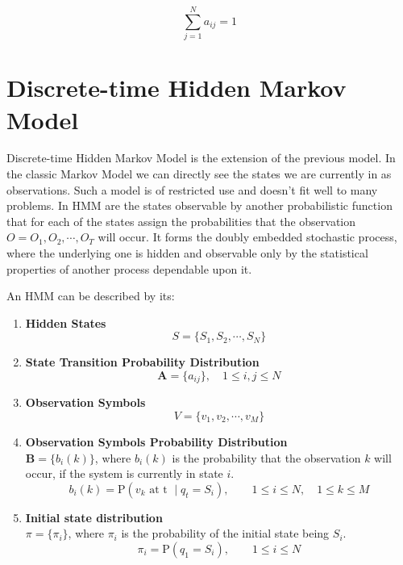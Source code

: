 \documentclass[thesis=M,english]{FITthesis}[2012/10/20]
\newcommand{\matr}[1]{\mathbf{#1}}
\begin{document}
\begin{equation}
   \sum_{j=1}^N a_{ij} = 1
\end{equation}

\section{Discrete-time Hidden Markov Model}

Discrete-time Hidden Markov Model is the extension of the previous model. In the classic Markov Model we can directly see the states we are currently in as observations. Such a model is of restricted use and doesn't fit well to many problems. In HMM are the states observable by another probabilistic function that for each of the states assign the probabilities that the observation $O = O_1,O_2,\cdots,O_T$ will occur. It forms the doubly embedded stochastic process, where the underlying one is hidden and observable only by the statistical properties of another process dependable upon it.

An HMM can be described by its:

\begin{enumerate}[resume]
\setcounter{enumi}{0}
\item \textbf{Hidden States}
\begin{equation}
S = \{ S_1,S_2, \cdots, S_N \}
\end{equation} 
\item \textbf{State Transition Probability Distribution}
\begin{equation}\label{eq:tp}
\matr{A} = \{ a_{ij} \}, \quad 1 \leq i,j \leq N
\end{equation} 
\item \textbf{Observation Symbols}
\begin{equation}
V = \{ v_1,v_2, \cdots, v_M \} 
\end{equation}
\item \textbf{Observation Symbols Probability Distribution} \\
$\matr{B} = \{ b_{i}(k) \}$, where $b_{i}(k)$ is the probability that the observation $k$ will occur, if the system is currently in state $i$. 
\begin{equation}
b_i(k) = \mathrm{P}(v_k \text{ at t } \mid q_t = S_i), \qquad 1 \leq i \leq N, \quad 1 \leq k \leq M
\end{equation}
\item \textbf{Initial state distribution} \\
$\pi = \{ \pi_i \}$, where $\pi_i$ is the probability of the initial state being $S_i$.
\begin{equation}
\pi_{i} = \mathrm{P}(q_1 = S_i), \qquad 1 \leq i \leq N
\end{equation}
\end{enumerate}
\end{document}
